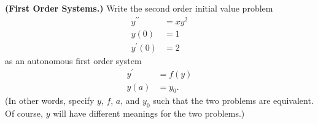 \textbf{(First Order Systems.)} Write the second order initial value
problem
\begin{align}
y^{\prime\prime} &= xy^2 \\
y(0) &= 1 \\
y^\prime(0) &= 2
\end{align}
as an autonomous first order system
\begin{align}
  y^\prime &= f(y)\\
y(a) &= y_0.
\end{align}
(In other words, specify $y$, $f$, $a$, and $y_0$ such that the two
problems are equivalent. Of course, $y$ will have different meanings
for the two problems.)

{\color{blue}



}
